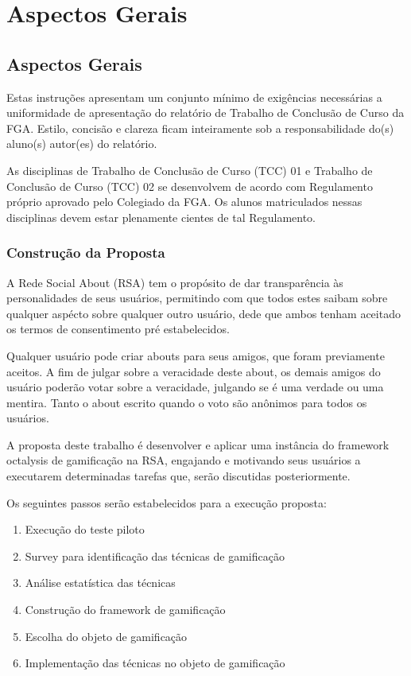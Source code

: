 \part{Aspectos Gerais}

\chapter[Aspectos Gerais]{Aspectos Gerais}

Estas instruções apresentam um conjunto mínimo de exigências necessárias a 
uniformidade de apresentação do relatório de Trabalho de Conclusão de Curso 
da FGA. Estilo, concisão e clareza ficam inteiramente sob a 
responsabilidade do(s) aluno(s) autor(es) do relatório.

As disciplinas de Trabalho de Conclusão de Curso (TCC) 01 e Trabalho de 
Conclusão de Curso (TCC) 02 se desenvolvem de acordo com Regulamento 
próprio aprovado pelo Colegiado da FGA. Os alunos matriculados nessas 
disciplinas devem estar plenamente cientes de tal Regulamento. 

\section{Construção da Proposta}
\label{sec:constru_o_da_proposta}
A Rede Social About (RSA) tem o propósito de dar transparência às personalidades de seus usuários, permitindo com que todos
estes saibam sobre qualquer aspécto sobre qualquer outro usuário, dede que ambos tenham aceitado os
termos de consentimento pré estabelecidos.

Qualquer usuário pode criar abouts para seus amigos, que foram previamente aceitos. A fim de julgar
sobre a veracidade deste about, os demais amigos do usuário poderão votar sobre a veracidade,
julgando se é uma verdade ou uma mentira. Tanto o about escrito quando o voto são anônimos para todos os
usuários.

A proposta deste trabalho é desenvolver e aplicar uma instância do framework octalysis de gamificação na RSA, engajando e
motivando seus usuários a executarem determinadas tarefas que, serão discutidas posteriormente.

Os seguintes
passos serão estabelecidos para a execução proposta:

\begin{enumerate}
    \item Execução do teste piloto
    \item Survey para identificação das técnicas de gamificação
    \item Análise estatística das técnicas
    \item Construção do framework de gamificação
    \item Escolha do objeto de gamificação
    \item Implementação das técnicas no objeto de gamificação
\end{enumerate}


